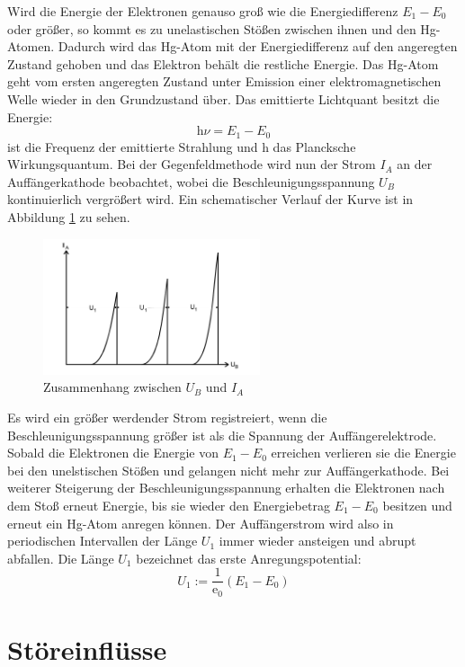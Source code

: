 Wird die Energie der Elektronen genauso groß wie die Energiedifferenz $E_1 -E_0$ oder größer, so kommt es zu unelastischen Stößen zwischen ihnen und den Hg-Atomen.
Dadurch wird das Hg-Atom mit der Energiedifferenz auf den angeregten Zustand gehoben und das Elektron behält die restliche Energie.
Das Hg-Atom geht vom ersten angeregten Zustand unter Emission einer elektromagnetischen Welle wieder in den Grundzustand über.
Das emittierte Lichtquant besitzt die Energie:
\begin{equation}
    \text{h} \nu = E_1 - E_0
    \label{eqn:gl3}
\end{equation}
\nu ist die Frequenz der emittierte Strahlung und h das Plancksche Wirkungsquantum.
Bei der Gegenfeldmethode wird nun der Strom $I_A$ an der Auffängerkathode beobachtet, wobei die Beschleunigungsspannung $U_B$ kontinuierlich vergrößert wird. 
Ein schematischer Verlauf der Kurve ist in Abbildung \ref{fig:abb2} zu sehen. 
\begin{figure}
    \centering
    \includegraphics[height=4.0cm]{data/abb2.jpg}
    \caption{Zusammenhang zwischen $U_B$ und $I_A$  \cite{V601}}
    \label{fig:abb2}
\end{figure}
Es wird ein größer werdender Strom registreiert, wenn die Beschleunigungsspannung größer ist als die Spannung der Auffängerelektrode.
Sobald die Elektronen die Energie von $E_1 - E_0$ erreichen verlieren sie die Energie bei den unelstischen Stößen und gelangen nicht mehr zur Auffängerkathode.
Bei weiterer Steigerung der Beschleunigungsspannung erhalten die Elektronen nach dem Stoß erneut Energie, bis sie wieder den Energiebetrag $E_1 -E_0$ besitzen und erneut ein Hg-Atom anregen können.
Der Auffängerstrom wird also in periodischen Intervallen der Länge $U_1$ immer wieder ansteigen und abrupt abfallen. 
Die Länge $U_1$ bezeichnet das erste Anregungspotential:
\begin{equation}
    U_1 := \frac{1}{\text{e}_0}(E_1 - E_0)
    \label{eqn:gl4}
\end{equation}

\section{Störeinflüsse}
\label{Stoer}

